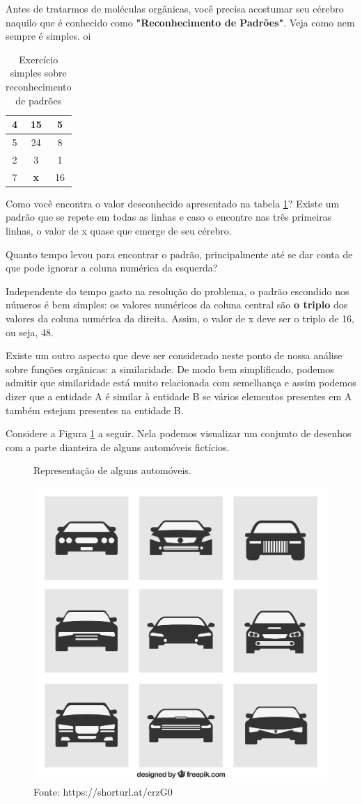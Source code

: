 Antes de tratarmos de moléculas orgânicas, você precisa acostumar seu cérebro naquilo que é conhecido como \textbf{"Reconhecimento de Padrões"}. Veja como nem sempre é simples. oi

\begin{table}[!h]
	\begin{center}
	\caption{\label{padroes}Exercício simples sobre reconhecimento de padrões}
	\vspace{0.5cm}
	\begin{tabular}{|c | c | c|}
	\hline
	4 & 15 & 5\\
	\hline
	5 & 24 & 8\\
    \hline
	2 & 3 & 1\\
	\hline
    7 & \textbf{x} & 16\\
    \hline
	\end{tabular}
	\end{center}
\end{table}

Como você encontra o valor desconhecido apresentado na tabela \ref{padroes}? Existe um padrão que se repete em todas as linhas e caso o encontre nas três primeiras linhas, o valor de x quase que emerge de seu cérebro. 

Quanto tempo levou para encontrar o padrão, principalmente até se dar conta de que pode ignorar a coluna numérica da esquerda?

Independente do tempo gasto na resolução do problema, o padrão escondido nos números é bem simples: os valores numéricos da coluna central são \textbf{o triplo} dos valores da coluna numérica da direita. Assim, o valor de x deve ser o triplo de 16, ou seja, 48.

Existe um outro aspecto que deve ser considerado neste ponto de nossa análise sobre funções orgânicas: a similaridade. De modo bem simplificado, podemos admitir que similaridade está muito relacionada com semelhança e assim podemos dizer que a entidade A é similar à entidade B se vários elementos presentes em A também estejam presentes na entidade B.

Considere a Figura \ref{fig:carros} a seguir. Nela podemos visualizar um conjunto de desenhos com a parte dianteira de alguns automóveis fictícios.

\begin{figure}[h]
	\centering
	\caption{Representação de alguns automóveis.}
	\vspace{0.5cm}
	\includegraphics[width=0.5\linewidth]{imagens/19035-NRYBNX.jpg}
    \caption*{Fonte: https://shorturl.at/crzG0}
	\label{fig:carros}
\end{figure}

